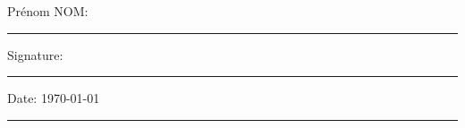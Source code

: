 \documentclass[12pt,oneside,french]{book}
\begin{document}
\noindent Prénom NOM: \\[1mm]
\rule[1em]{25em}{0.5pt}

\noindent Signature:\\[1mm]
\rule[1em]{25em}{0.5pt}

\noindent Date: \today \\[1mm]
\rule[1em]{25em}{0.5pt}







\tableofcontents
\listoffigures
\listoftables



\mainmatter





%





 
 
\printglossary[title={Glossaire},toctitle={Glossaire}]


\begin{appendices}

%
\end{appendices}
\end{document}
